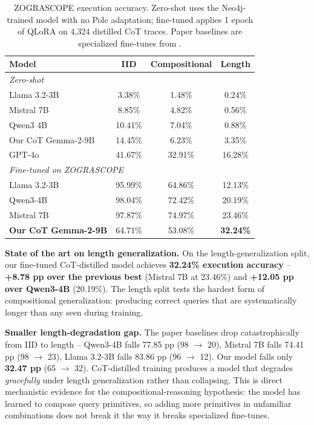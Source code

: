 \documentclass[11pt]{article}
\begin{document}
\begin{table}[h]
\centering
\small
\caption{ZOGRASCOPE execution accuracy. Zero-shot uses the Neo4j-trained model with no Pole adaptation; fine-tuned applies 1 epoch of QLoRA on 4{,}324 distilled CoT traces. Paper baselines are specialized fine-tunes from \citet{zograscope2025}.}
\label{tab:zograscope}
\begin{tabular}{lccc}
\toprule
\textbf{Model} & \textbf{IID} & \textbf{Compositional} & \textbf{Length} \\
\midrule
\multicolumn{4}{l}{\emph{Zero-shot}} \\
Llama 3.2-3B & 3.38\% & 1.48\% & 0.24\% \\
Mistral 7B & 8.85\% & 4.82\% & 0.56\% \\
Qwen3 4B & 10.41\% & 7.04\% & 0.88\% \\
Our CoT Gemma-2-9B & 14.45\% & 6.23\% & 3.35\% \\
GPT-4o & 41.67\% & 32.91\% & 16.28\% \\
\midrule
\multicolumn{4}{l}{\emph{Fine-tuned on ZOGRASCOPE}} \\
Llama 3.2-3B & 95.99\% & 64.86\% & 12.13\% \\
Qwen3-4B & 98.04\% & 72.42\% & 20.19\% \\
Mistral 7B & 97.87\% & 74.97\% & 23.46\% \\
\textbf{Our CoT Gemma-2-9B} & 64.71\% & 53.08\% & \textbf{32.24\%} \\
\bottomrule
\end{tabular}
\end{table}

\textbf{State of the art on length generalization.} On the length-generalization split, our fine-tuned CoT-distilled model achieves \textbf{32.24\% execution accuracy} -- \textbf{+8.78 pp over the previous best} (Mistral 7B at 23.46\%) and \textbf{+12.05 pp over Qwen3-4B} (20.19\%). The length split tests the hardest form of compositional generalization: producing correct queries that are systematically longer than any seen during training.

\textbf{Smaller length-degradation gap.} The paper baselines drop catastrophically from IID to length -- Qwen3-4B falls 77.85 pp (98 $\to$ 20), Mistral 7B falls 74.41 pp (98 $\to$ 23), Llama 3.2-3B falls 83.86 pp (96 $\to$ 12). Our model falls only \textbf{32.47 pp} (65 $\to$ 32). CoT-distilled training produces a model that degrades \emph{gracefully} under length generalization rather than collapsing. This is direct mechanistic evidence for the compositional-reasoning hypothesis: the model has learned to compose query primitives, so adding more primitives in unfamiliar combinations does not break it the way it breaks specialized fine-tunes.
\end{document}
